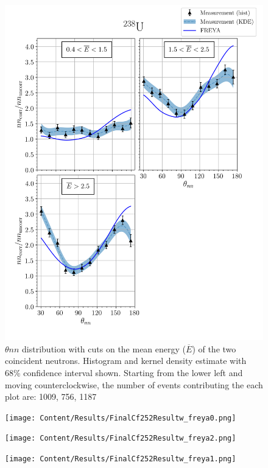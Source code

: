 \begin{figure}
\centering
    \includegraphics[width = 1.1\textwidth]{Content/Results/FinalDUResultw_freya1KDE.png}
    \caption{$\theta{nn}$ distribution with cuts on the mean energy ($\overline{E}$) of the two coincident neutrons.
    Histogram and kernel density estimate with 68\% confidence interval shown.
    Starting from the lower left and moving counterclockwise, the number of events contributing the each plot are: 1009, 756, 1187 }
    \label{fig:DU(1)}
\end{figure}

\begin{figure}
\centering
    \texttt{[image: Content/Results/FinalCf252Resultw\_freya0.png]}
    \caption{}
    \label{fig:Cf(0)}
\end{figure}
\begin{figure}
\centering
    \texttt{[image: Content/Results/FinalCf252Resultw\_freya2.png]}
    \caption{}
    \label{fig:Cf(2)}
\end{figure}
\begin{figure}
\centering
    \texttt{[image: Content/Results/FinalCf252Resultw\_freya1.png]}
    \caption{}
    \label{fig:Cf(1)}
\end{figure}
\FloatBarrier


